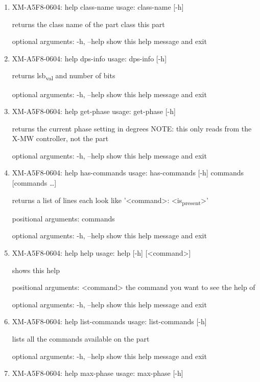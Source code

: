 \documentclass[11pt]{article}
\begin{document}
\begin{enumerate}
\item XM-A5F8-0604: help class-name
\label{sec:orge659530}
usage: class-name [-h]

returns the class name of the part class this part

optional arguments:
  -h, --help  show this help message and exit

\item XM-A5F8-0604: help dps-info
\label{sec:org49d2d27}
usage: dps-info [-h]

returns lsb\textsubscript{val} and number of bits

optional arguments:
  -h, --help  show this help message and exit

\item XM-A5F8-0604: help get-phase
\label{sec:org6fcea00}
usage: get-phase [-h]

returns the current phase setting in degrees NOTE: this only reads from the
X-MW controller, not the part

optional arguments:
  -h, --help  show this help message and exit

\item XM-A5F8-0604: help has-commands
\label{sec:orgd12dfd1}
usage: has-commands [-h] commands [commands \ldots{}]

returns a list of lines each look like '<command>: <is\textsubscript{present}>'

positional arguments:
  commands

optional arguments:
  -h, --help  show this help message and exit

\item XM-A5F8-0604: help help
\label{sec:orgf67cb35}
usage: help [-h] [<command>]

shows this help

positional arguments:
  <command>   the command you want to see the help of

optional arguments:
  -h, --help  show this help message and exit

\item XM-A5F8-0604: help list-commands
\label{sec:orgdf5e5df}
usage: list-commands [-h]

lists all the commands available on the part

optional arguments:
  -h, --help  show this help message and exit

\item XM-A5F8-0604: help max-phase
\label{sec:org7d45629}
usage: max-phase [-h]


\end{enumerate}
\end{document}
